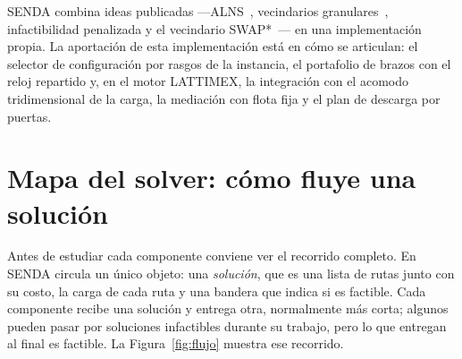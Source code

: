 \documentclass[11pt,a4paper]{article}
\newcommand{\senda}{SENDA}
\begin{document}
SENDA combina ideas publicadas ---ALNS~\cite{ropke2006}, vecindarios granulares~\cite{toth2003granular},
infactibilidad penalizada y el vecindario SWAP*~\cite{vidal2022hgs}--- en una implementación propia.
La aportación de esta implementación está en cómo se articulan: el selector de configuración por rasgos de la instancia, el
portafolio de brazos con el reloj repartido y, en el motor LATTIMEX, la integración con el acomodo
tridimensional de la carga, la mediación con flota fija y el plan de descarga por puertas.

\section{Mapa del solver: cómo fluye una solución}
\label{sec:flujo}

Antes de estudiar cada componente conviene ver el recorrido completo. En \senda{} circula un único
objeto: una \emph{solución}, que es una lista de rutas junto con su costo, la carga de cada ruta y
una bandera que indica si es factible. Cada componente recibe una solución y entrega otra,
normalmente más corta; algunos pueden pasar por soluciones infactibles durante su trabajo, pero lo
que entregan al final es factible. La Figura~\ref{fig:flujo} muestra ese recorrido.
\end{document}
